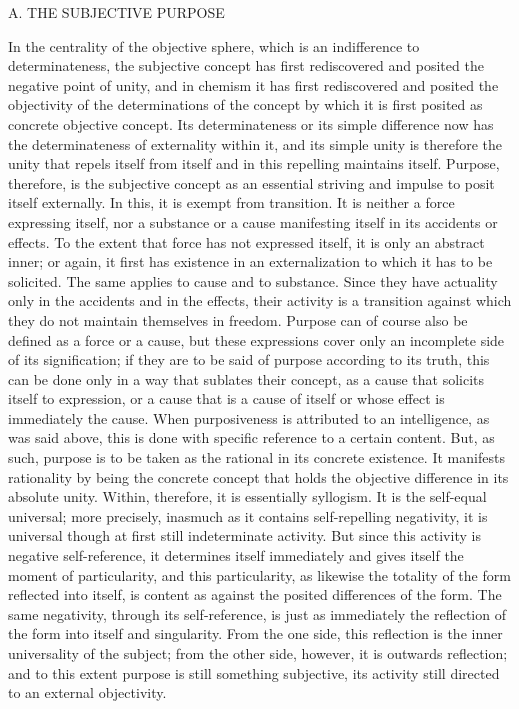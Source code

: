 A. THE SUBJECTIVE PURPOSE

In the centrality of the objective sphere,
which is an indifference to determinateness,
the subjective concept has first rediscovered
and posited the negative point of unity,
and in chemism it has first rediscovered
and posited the objectivity of the determinations
of the concept by which it is first posited
as concrete objective concept.
Its determinateness or its simple difference now
has the determinateness of externality within it,
and its simple unity is therefore
the unity that repels itself from itself
and in this repelling maintains itself.
Purpose, therefore, is the subjective concept as
an essential striving and impulse
to posit itself externally.
In this, it is exempt from transition.
It is neither a force expressing itself,
nor a substance or a cause manifesting
itself in its accidents or effects.
To the extent that force has not expressed
itself, it is only an abstract inner;
or again, it first has existence in
an externalization to which it has to be solicited.
The same applies to cause and to substance.
Since they have actuality only in
the accidents and in the effects,
their activity is a transition against which
they do not maintain themselves in freedom.
Purpose can of course also be
defined as a force or a cause,
but these expressions cover only
an incomplete side of its signification;
if they are to be said of purpose according to its truth,
this can be done only in a way that sublates their concept,
as a cause that solicits itself to expression,
or a cause that is a cause of itself
or whose effect is immediately the cause.
When purposiveness is attributed to
an intelligence, as was said above,
this is done with specific reference
to a certain content.
But, as such, purpose is to be taken as
the rational in its concrete existence.
It manifests rationality by being
the concrete concept that holds
the objective difference in its absolute unity.
Within, therefore, it is essentially syllogism.
It is the self-equal universal;
more precisely, inasmuch as it contains
self-repelling negativity,
it is universal though at first
still indeterminate activity.
But since this activity is negative self-reference,
it determines itself immediately and
gives itself the moment of particularity,
and this particularity,
as likewise the totality of the form reflected into itself,
is content as against the posited differences of the form.
The same negativity, through its self-reference,
is just as immediately the reflection of the form
into itself and singularity.
From the one side, this reflection is
the inner universality of the subject;
from the other side, however,
it is outwards reflection;
and to this extent purpose is
still something subjective,
its activity still directed to
an external objectivity.


